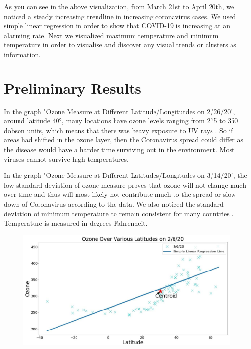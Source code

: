 \documentclass[10pt,journal,compsoc]{IEEEtran}
\begin{document}
{{	As you can see in the above visualization, from March 21st to April 20th, we noticed a steady increasing trendline in increasing coronavirus cases. We used simple linear regression in order to show that COVID-19 is increasing at an alarming rate. Next we visualized maximum temperature and minimum temperature in order to visualize and discover any visual trends or clusters as information. 

\section{Preliminary Results}\label{sec:preliminary results}

	In the graph "Ozone Measure at Different Latitude/Longitutdes on 2/26/20", around latitude 40°, many locations have ozone levels ranging from 275 to 350 dobson units, which means that there was heavy exposure to UV rays . So if areas had shifted in the ozone layer, then the Coronavirus spread could differ as the disease would have a harder time surviving out in the environment. Most viruses cannot survive high temperatures. 

	In the graph "Ozone Measure at Different Latitudes/Longitudes on 3/14/20", the low standard deviation of ozone measure proves that ozone will not change much over time and thus will most likely not contribute much to the spread or slow down of Coronavirus according to the data. We also noticed the standard deviation of minimum temperature to remain consistent for many countries . Temperature is measured in degrees Fahrenheit.
\newline

\begin{figure}[!htbp] %
	\includegraphics[scale=0.6]{ozone-feb-centroid.png}\\ 
	\centering
	\label{LP-COVID-Ozone February 26th}
\end{figure}

}}
\end{document}
